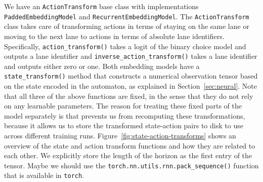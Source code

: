 \documentclass[a4paper]{article}
\theoremstyle{definition}
\theoremstyle{plain}
\begin{document}
We have an \texttt{ActionTransform} base class with implementations
\texttt{PaddedEmbeddingModel} and \texttt{RecurrentEmbeddingModel}. The
\texttt{ActionTransform} class takes care of transforming actions in terms of
staying on the same lane or moving to the next lane to actions in terms of
absolute lane identifiers. Specifically, \texttt{action\_transform()} takes a
logit of the binary choice model and outputs a lane identifier and
\texttt{inverse\_action\_transform()} takes a lane identifier and outputs either
zero or one.
%
Both embedding models have a \texttt{state\_transform()} method that constructs a
numerical observation tensor based on the state encoded in the automaton, as
explained in Section~\ref{sec:neural}. Note that all three of the above functions are fixed,
in the sense that they do not rely on any learnable parameters. The reason for
treating these fixed parts of the model separately is that prevents us from
recomputing these transformations, because it allows us to store the transformed
state-action pairs to disk to use across different training runs.
%
Figure~\ref{fig:state-action-transforms} shows an overview of the state and action transform functions and how
they are related to each other.
%
We explicitly store the length of the
horizon as the first entry of the tensor. Maybe we should use the
\texttt{torch.nn.utils.rnn.pack\_sequence()} function that is available in
\texttt{torch}.
\end{document}
